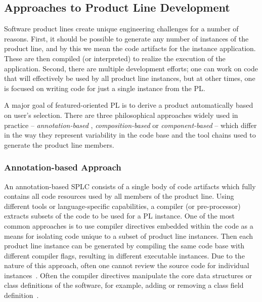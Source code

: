 

\subsection{Approaches to Product Line Development}

Software product lines create unique engineering challenges for a number
of reasons. First, it should be possible to generate any number of
instances of the product line, and by this we mean the code artifacts
for the instance application. These are then compiled (or interpreted)
to realize the execution of the application. Second, there are multiple
development efforts; one can work on code that will effectively be used
by all product line instances, but at other times, one is focused on
writing code for just a single instance from the PL.

A major goal of featured-oriented PL is to derive a product
automatically based on user’s selection. There are three philosophical
approaches widely used in practice -- \textit{annotation-based} ,
\textit{composition-based} or \textit{component-based} -- which differ
in the way they represent variability in the code base and the tool
chains used to generate the product line members.

\subsubsection{Annotation-based Approach}

An annotation-based SPLC consists of a single body of code artifacts
which fully contains all code resources used by all members of the
product line. Using different tools or language-specific capabilities, a
compiler (or pre-processor) extracts subsets of the code to be used for
a PL instance. One of the most common approaches is to use compiler
directives embedded within the code as a means for isolating code unique
to a subset of product line instances. Then each product line instance
can be generated by compiling the same code base with different compiler
flags, resulting in different executable instances. Due to the nature of
this approach, often one cannot review the source code for individual
instances~\cite{Apel:2013:FSP:2541773}. Often the compiler directives
manipulate the core data structures or class definitions of the
software, for example, adding or removing a class field
definition~\cite{Liebig:2010:AVF:1806799.1806819}.

